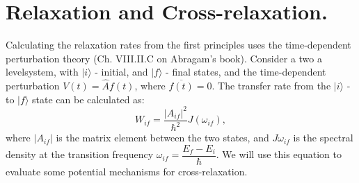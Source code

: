 \documentclass[a4paper, 12pt]{article}
\begin{document}
\section{Relaxation and Cross-relaxation.}
Calculating the relaxation rates from the first principles uses the time-dependent perturbation theory (Ch. VIII.II.C on Abragam's book). Consider a two a levelsystem, with $\vert i \rangle$ - initial, and $\vert f \rangle$ - final states, and the time-dependent perturbation $V(t) = \hat{A} f(t)$, where $\overline{f(t)} = 0$. The transfer rate from the $\vert i \rangle$ - to  $\vert f \rangle$ state can be calculated as:
\begin{equation} \label{eq:rate}
 W_{if} = \dfrac{ \vert A_{if} \vert ^2  }{\hbar^2} J(\omega_{if}),
\end{equation}
where $\vert A_{if} \vert$ is the matrix element between the two states, and $J{\omega_{if}}$ is the spectral density at the transition frequency $\omega_{if} = \dfrac{E_f - E_i}{\hbar}$. 
We will use this equation to evaluate some potential mechanisms for cross-relaxation.
\end{document}
